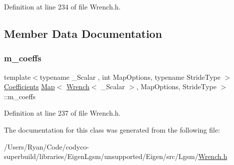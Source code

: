 Definition at line 234 of file Wrench.\+h.



\subsection{Member Data Documentation}
\hypertarget{class_map_3_01_wrench_3_01___scalar_01_4_00_01_map_options_00_01_stride_type_01_4_a77801912f5f6b222ed126ed4002a8edf}{}\label{class_map_3_01_wrench_3_01___scalar_01_4_00_01_map_options_00_01_stride_type_01_4_a77801912f5f6b222ed126ed4002a8edf} 
\subsubsection{\texorpdfstring{m\+\_\+coeffs}{m\_coeffs}}
{\footnotesize\ttfamily template$<$typename \+\_\+\+Scalar , int Map\+Options, typename Stride\+Type $>$ \\
\hyperlink{class_map_3_01_wrench_3_01___scalar_01_4_00_01_map_options_00_01_stride_type_01_4_abfc1bf3f7dc1d3051325edad634172e8}{Coefficients} \hyperlink{class_map_3_01_wrench_3_01___scalar_01_4_00_01_map_options_00_01_stride_type_01_4_ab778c7158f5d29d76672346ecfe4e3ea}{Map}$<$ \hyperlink{class_wrench}{Wrench}$<$ \+\_\+\+Scalar $>$, Map\+Options, Stride\+Type $>$\+::m\+\_\+coeffs\hspace{0.3cm}{\ttfamily [protected]}}



Definition at line 237 of file Wrench.\+h.



The documentation for this class was generated from the following file\+:\begin{DoxyCompactItemize}
\item 
/\+Users/\+Ryan/\+Code/codyco-\/superbuild/libraries/\+Eigen\+Lgsm/unsupported/\+Eigen/src/\+Lgsm/\hyperlink{_wrench_8h}{Wrench.\+h}\end{DoxyCompactItemize}
